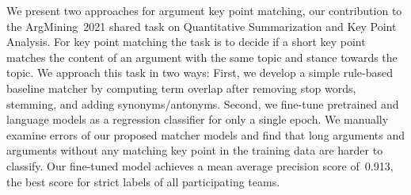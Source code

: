 We present two approaches for argument key point matching, our contribution to the ArgMining~2021 shared task on Quantitative Summarization and Key Point Analysis.
For key point matching the task is to decide if a short key point matches the content of an argument with the same topic and stance towards the topic.
We approach this task in two ways:
First, we develop a simple rule-based baseline matcher by computing term overlap after removing stop words, stemming, and adding synonyms/antonyms.
Second, we fine-tune pretrained \Bert and \Roberta language models as a regression classifier for only a single epoch.
We manually examine errors of our proposed matcher models and find that long arguments and arguments without any matching key point in the training data are harder to classify.
Our fine-tuned \RobertaBase model achieves a mean average precision score of~0.913, the best score for strict labels of all participating teams.
